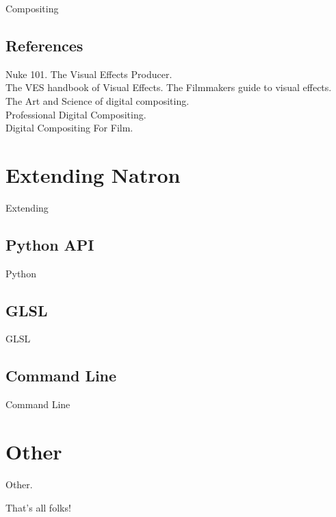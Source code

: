 \documentclass[10pt,oneside,openany,letterpaper]{memoir}
\begin{document}
Compositing

\chapter{References}
Nuke 101. The Visual Effects Producer. \\
The VES handbook of Visual Effects. The Filmmakers guide to visual effects. \\
The Art and Science of digital compositing. \\
Professional Digital Compositing. \\
Digital Compositing For Film.


\part{ Extending Natron}
Extending

\chapter{Python API}
Python

\chapter{GLSL}
GLSL

\chapter{Command Line}
Command Line



\part{Other}
Other.




That's all folks!
\end{document}
